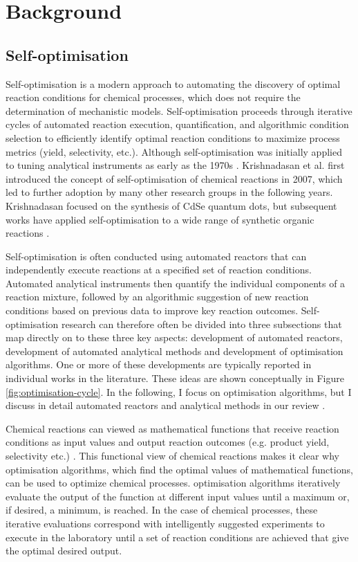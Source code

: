 \section{Background}

\subsection{Self-optimisation}

Self-optimisation is a modern approach to automating the discovery of optimal reaction conditions for chemical processes, which does not require the determination of mechanistic models. Self-optimisation proceeds through iterative cycles of automated reaction execution, quantification, and algorithmic condition selection to efficiently identify optimal reaction conditions to maximize process metrics (yield, selectivity, etc.). Although self-optimisation was initially applied to tuning analytical instruments as early as the 1970s \cite{Routh1977}. Krishnadasan et al. \cite{Krishnadasan2007} first introduced the concept of self-optimisation of chemical reactions in 2007, which led to further adoption by many other research groups in the following years. Krishnadasan focused on the synthesis of CdSe quantum dots, but subsequent works have applied self-optimisation to a wide range of synthetic organic reactions \cite{McMullen2010a, McMullen2011, Bourne2011, Moore2012, christensen2021, Reizman2016b, Fitzpatrick2016,Echtermeyer2017}.

Self-optimisation is often conducted using automated reactors that can independently execute reactions at a specified set of reaction conditions. Automated analytical instruments then quantify the individual components of a reaction mixture, followed by an algorithmic suggestion of new reaction conditions based on previous data to improve key reaction outcomes. Self-optimisation research can therefore often be divided into three subsections that map directly on to these three key aspects: development of automated reactors, development of automated analytical methods and development of optimisation algorithms. One or more of these developments are typically reported in individual works in the literature. These ideas are shown conceptually in Figure \ref{fig:optimisation-cycle}.  In the following, I focus on optimisation algorithms, but I discuss in detail automated reactors and analytical methods in our review \cite{Taylor2023a}.

Chemical reactions can viewed as mathematical functions that receive reaction conditions as input values and output reaction outcomes (e.g. product yield, selectivity etc.) \cite{Clayton2019}. This functional view of chemical reactions makes it clear why optimisation algorithms, which find the optimal values of mathematical functions, can be used to optimize chemical processes. optimisation algorithms iteratively evaluate the output of the function at different input values until a maximum or, if desired, a minimum, is reached. In the case of chemical processes, these iterative evaluations correspond with intelligently suggested experiments to execute in the laboratory until a set of reaction conditions are achieved that give the optimal desired output.

